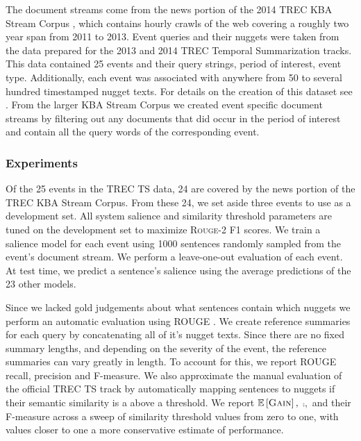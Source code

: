     
  The document streams come from the news portion of the 2014 TREC
KBA Stream Corpus \citep{frank2012building}, which contains hourly crawls
of the web covering a roughly two year span from 2011 to 2013.
Event queries and their nuggets were taken from the data prepared for 
the 2013 and 2014 TREC Temporal Summarization tracks. This data
contained 25 events and their query strings, period of interest, 
event type. 
Additionally, each event was associated with anywhere from 50 to several
hundred timestamped nugget texts. 
For details on the creation of this dataset see \cite{aslam2014trec,aslam2015trec}.
From the larger KBA Stream Corpus we created event specific document 
streams by filtering out any documents that did occur in the period
of interest and contain all the query words of the corresponding event.  



    \subsubsection{Experiments}

    

Of the 25 events in the TREC TS data, 24 are
covered by the news portion of the TREC KBA
Stream Corpus. From these 24, we set aside
three events to use as a development set. All
system salience and similarity threshold parameters
are tuned on the development set to maximize
\textsc{Rouge-2} \textsc{F1} scores.
We train a salience model for each event using
1000 sentences randomly sampled from the
event's document stream.
We perform a leave-one-out evaluation of each
event. At test time, we predict a sentence’s
salience using the average predictions of the 23
other models.



    Since we lacked gold judgements about what sentences contain which nuggets
    we perform an automatic evaluation using ROUGE \cite{lin2004rouge}. We 
    create reference summaries for each query by concatenating all 
    of it's nugget texts.
    Since there are no fixed summary lengths, and depending on the severity
    of the event, the reference summaries can vary greatly in length.
    To account for this, we report ROUGE recall, precision and F-measure.
We also approximate the manual evaluation of the official TREC TS track
    by automatically mapping sentences to nuggets if their semantic similarity
    is a above a threshold. 
    We report $\mathbb{E}\left[\textsc{Gain}\right],$ $\comp,$ and their F-measure
    across a sweep of similarity threshold 
    values from zero to one, with values closer to one a more conservative
    estimate of performance.     


